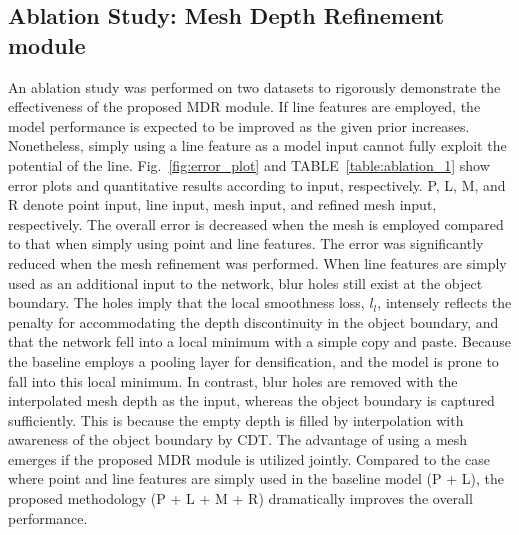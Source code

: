 \subsection{Ablation Study: Mesh Depth Refinement module}\label{sec:exp_ablation}


An ablation study was performed on two datasets to \textcolor{color1}{rigorously demonstrate the effectiveness of} the proposed MDR \textcolor{color1}{module}. 
If line features are employed, the model performance is expected to be improved as the given prior increases. Nonetheless, simply using \textcolor{color1}{a} line feature as a model input \textcolor{color1}{cannot} fully \textcolor{color1}{exploit} the \textcolor{color1}{potential of the line}. 
Fig.~\ref{fig:error_plot} and TABLE~\ref{table:ablation_1} show error plots and quantitative results according to input, respectively. P, L, M, and R denote point input, line input, mesh input, and refined mesh input, respectively.
The overall error \textcolor{color1}{is decreased} when the mesh \textcolor{color1}{is} employed \textcolor{color1}{compared to that} when simply using point and line features. The error was \textcolor{color1}{significantly} reduced when \textcolor{color1}{the} mesh refinement was performed.
When line features are simply used as an additional input to the network, blur holes still exist at the object boundary. 
The holes imply that the local smoothness loss\textcolor{color1}{,} $l_l$\textcolor{color1}{,} intensely reflect\textcolor{color1}{s} the penalty for accommodating the depth discontinuity \textcolor{color1}{in} the object boundary, and \textcolor{color1}{that} the network fell into a local minimum with a simple copy and paste. \textcolor{color1}{Because} the baseline employs a pooling layer for \textcolor{color1}{densification, and} the model \textcolor{color1}{is prone to} fall into this local minimum. 
In contrast, blur holes \textcolor{color1}{are} removed with the interpolated mesh depth as \textcolor{color1}{the} input\textcolor{color1}{, whereas} the object boundary \textcolor{color1}{is} captured sufficiently. \textcolor{color1}{This is because} the empty depth is filled \textcolor{color1}{by} interpolation with awareness of the object boundary \textcolor{color1}{by} CDT. 
The advantage of using \textcolor{color1}{a} mesh \textcolor{color1}{emerges} if the proposed MDR module is utilized jointly. Compared \textcolor{color1}{to} the case where point and line features \textcolor{color1}{are simply} used in the baseline model (P + L), the proposed methodology (P + L + M + R) dramatically improve\textcolor{color1}{s} the overall performance. 

